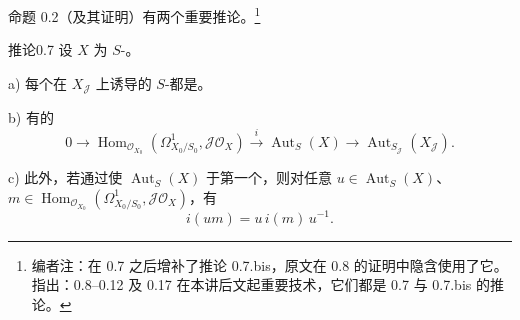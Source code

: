 命题 0.2（及其证明）有两个重要推论。\footnote{编者注：在 0.7 之后增补了推论 0.7.bis，原文在 0.8 的证明中隐含使用了它。指出：0.8--0.12 及 0.17 在本讲后文起重要技术，它们都是 0.7 与 0.7.bis 的推论。}
\begin{SGAresult}{推论}{0.7}
设 $X$ 为 $S$-。

a) 每个在 $X_{\mathcal J}$ 上诱导的 $S$-都是。

b) 有的
\[0\longrightarrow\operatorname{Hom}_{\mathcal O_{X_0}}(\Omega^1_{X_0/S_0},\mathcal J\mathcal O_X)\xrightarrow{i}\operatorname{Aut}_S(X)\longrightarrow\operatorname{Aut}_{S_{\mathcal J}}(X_{\mathcal J}).\]

c) 此外，若通过使 $\operatorname{Aut}_S(X)$ 于第一个，则对任意 $u\in\operatorname{Aut}_S(X)$、$m\in\operatorname{Hom}_{\mathcal O_{X_0}}(\Omega^1_{X_0/S_0},\mathcal J\mathcal O_X)$，有
\[i(um)=u\,i(m)\,u^{-1}.\]
\end{SGAresult}
